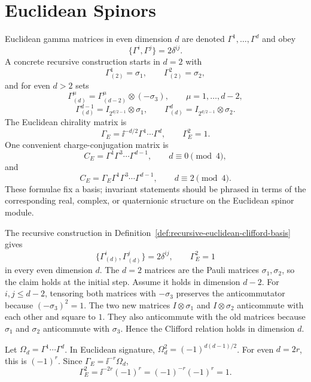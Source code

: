 \section{Euclidean Spinors}

\begin{definition}
\label{def:recursive-euclidean-clifford-basis}
Euclidean gamma matrices in even dimension \(d\) are denoted
\(\Gamma^1,\ldots,\Gamma^d\) and obey
\[
  \{\Gamma^i,\Gamma^j\}=2\delta^{ij}.
\]
A concrete recursive construction starts in \(d=2\) with
\[
  \Gamma^1_{(2)}=\sigma_1,
  \qquad
  \Gamma^2_{(2)}=\sigma_2,
\]
and for even \(d>2\) sets
\[
  \Gamma^\mu_{(d)}
  =
  \Gamma^\mu_{(d-2)}\otimes(-\sigma_3),
  \qquad
  \mu=1,\ldots,d-2,
\]
\[
  \Gamma^{d-1}_{(d)}
  =
  I_{2^{d/2-1}}\otimes\sigma_1,
  \qquad
  \Gamma^d_{(d)}
  =
  I_{2^{d/2-1}}\otimes\sigma_2 .
\]
The Euclidean chirality matrix is
\[
  \Gamma_E
  =
  \ii^{-d/2}\Gamma^1\cdots\Gamma^d,
  \qquad
  \Gamma_E^2=1 .
\]
One convenient charge-conjugation matrix is
\[
  C_E=\Gamma^1\Gamma^3\cdots\Gamma^{d-1},
  \qquad d\equiv0\pmod4,
\]
and
\[
  C_E=\Gamma_E\Gamma^1\Gamma^3\cdots\Gamma^{d-1},
  \qquad d\equiv2\pmod4.
\]
These formulae fix a basis; invariant statements should be phrased in terms
of the corresponding real, complex, or quaternionic structure on the
Euclidean spinor module.
\end{definition}

The recursive construction in
Definition~\ref{def:recursive-euclidean-clifford-basis} gives
\[
  \{\Gamma^i_{(d)},\Gamma^j_{(d)}\}=2\delta^{ij},
  \qquad
  \Gamma_E^2=1
\]
in every even dimension \(d\).
The \(d=2\) matrices are the Pauli matrices \(\sigma_1,\sigma_2\), so the
claim holds at the initial step.  Assume it holds in dimension \(d-2\).
For \(i,j\le d-2\), tensoring both matrices with \(-\sigma_3\) preserves the
anticommutator because \((-\sigma_3)^2=1\).  The two new matrices
\(I\otimes\sigma_1\) and \(I\otimes\sigma_2\) anticommute with each other and
square to \(1\).  They also anticommute with the old matrices because
\(\sigma_1\) and \(\sigma_2\) anticommute with \(\sigma_3\).  Hence the
Clifford relation holds in dimension \(d\).

Let \(\Omega_d=\Gamma^1\cdots\Gamma^d\).  In Euclidean signature,
\(\Omega_d^2=(-1)^{d(d-1)/2}\).  For even \(d=2r\), this is
\((-1)^r\).  Since \(\Gamma_E=\ii^{-r}\Omega_d\),
\[
  \Gamma_E^2=\ii^{-2r}(-1)^r=(-1)^{-r}(-1)^r=1.
\]

